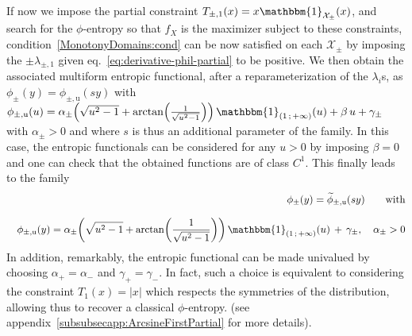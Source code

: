 \documentclass[entropy,article,submit,moreauthors,pdftex]{Definitions/mdpi}
\def\X{\mathcal{X}}%
\def\un{\mathbbm{1}}%
\def\u{\mathrm{u}}
\begin{document}
{\begin{Example}\label{arcsineMulti:ex}
  If now  we impose the  partial constraint $T_{\pm,1}(x) =  x \un_{\X_\pm}(x)$,
  and search  for the $\phi$-entropy so  that $f_X$ is the  maximizer subject to
  these constraints,  condition~\ref{MonotonyDomains:cond} can be  now satisfied
  on   each    $\X_\pm$   by   imposing   the    $\pm   \lambda_{\pm,1}$   given
  eq.~\eqref{eq:derivative-phil-partial}  to be  positive.  We  then obtain  the
  associated multiform  entropic functional,  after a reparameterization  of the
  $\lambda_i$s, as  $\phi_\pm(y) = \phi_{\pm,\u}(s y)$  with $\phi_{\pm,\u}(u) =
  \alpha_\pm  \left( \sqrt{u^2  - 1}  + \arctan\left(  \frac{1}{\sqrt{u^2 -  1}}
  \right) \right) \, \un_{(  1 \, ; \, +\infty )}(u) + \beta  \, u + \gamma_\pm$
  with $\alpha_\pm  > 0$ and  where $s$ is thus  an additional parameter  of the
  family.  In this case, the entropic functionals can be considered for any $u >
  0$ by imposing $\beta  = 0$ and one can check that  the obtained functions are
  of class $C^1$. This finally leads to the family
  \begin{eqnarray*}
  && \phi_\pm(y) =  \widetilde{\phi}_{\pm,\u}(s y) \qquad \mbox{with}
  \\[2.5mm]
   && \phi_{\pm,\u}(y) = \alpha_\pm  \left( \sqrt{u^2 -
   1} + \arctan\left( \frac{1}{\sqrt{u^2 - 1}} \right)  \right)
  \, \un_{(  1 \, ;  \, +\infty )}(u) \, + \, \gamma_\pm, \quad \alpha_\pm > 0
   \end{eqnarray*}
  In  addition, remarkably,  the entropic  functional can  be made  univalued by
  choosing $\alpha_+  = \alpha_-$ and  $\gamma_+ =  \gamma_-$.  In fact,  such a
  choice  is equivalent  to  considering  the constraint  $T_1(x)  = |x|$  which
  respects  the symmetries  of  the  distribution, allowing  thus  to recover  a
  classical                         $\phi$-entropy.                         (see
  appendix~\ref{subsubsecapp:ArcsineFirstPartial} for more details).
\end{Example}

}
\end{document}
